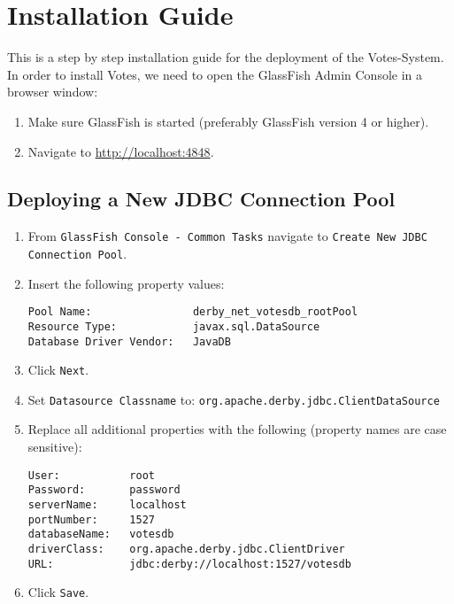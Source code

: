 \section{Installation Guide}
This is a step by step installation guide for the deployment of the Votes-System.
In order to install Votes, we need to open the GlassFish Admin Console in a browser window:

\begin{enumerate}

\item
Make sure GlassFish is started (preferably GlassFish version 4 or higher).

\item
Navigate to \url{http://localhost:4848}.

\end{enumerate}


\subsection{Deploying a New JDBC Connection Pool}

\begin{enumerate}

\item
From \texttt{GlassFish Console - Common Tasks} navigate to \texttt{Create New JDBC Connection Pool}.

\item
Insert the following property values:
\begin{verbatim}
Pool Name:                derby_net_votesdb_rootPool
Resource Type:            javax.sql.DataSource
Database Driver Vendor:   JavaDB
\end{verbatim}

\item
Click \texttt{Next}.

\item 
Set \texttt{Datasource Classname} to: \texttt{org.apache.derby.jdbc.ClientDataSource}

\item
Replace all additional properties with the following (property names are case sensitive):
\begin{verbatim}
User:           root
Password:       password
serverName:     localhost
portNumber:     1527
databaseName:   votesdb
driverClass:    org.apache.derby.jdbc.ClientDriver
URL:            jdbc:derby://localhost:1527/votesdb
\end{verbatim}

\item
Click \texttt{Save}.

\end{enumerate}

